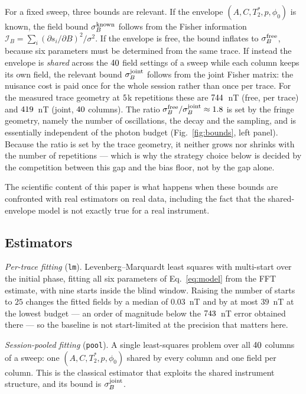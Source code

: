 \documentclass[aps,pra,twocolumn,superscriptaddress,nofootinbib]{revtex4-2}
\begin{document}
For a fixed sweep, three bounds are relevant. If the envelope $(A,C,T_2^{*},p,\phi_0)$ is
known, the field bound $\sigma_B^{\rm known}$ follows from the Fisher information
$\mathcal{I}_B=\sum_i(\partial s_i/\partial B)^2/\sigma^2$. If the envelope is free, the
bound inflates to $\sigma_B^{\rm free}$, because six parameters must be determined from the
same trace. If instead the envelope is \emph{shared} across the $40$ field settings of
a sweep while each column keeps its own field, the relevant bound
$\sigma_B^{\rm joint}$ follows from the joint Fisher matrix: the nuisance cost is paid once
for the whole session rather than once per trace. For the measured trace geometry at
$5$k repetitions these are $744$~nT (free, per trace) and
$419$~nT (joint, $40$ columns). The ratio
$\sigma_B^{\rm free}/\sigma_B^{\rm joint}\approx1.8$ is set by the fringe geometry, namely
the number of oscillations, the decay and the sampling, and is essentially independent of
the photon budget (Fig.~\ref{fig:bounds}, left panel). Because the ratio is set by the trace
geometry, it neither grows nor shrinks with the number of repetitions --- which is why the
strategy choice below is decided by the competition between this gap and the bias floor,
not by the gap alone.

The scientific content of this paper is what happens when these bounds are confronted with
real estimators on real data, including the fact that the shared-envelope model is not
exactly true for a real instrument.

\subsection{Estimators}

\emph{Per-trace fitting} (\texttt{lm}). Levenberg--Marquardt least squares with
multi-start over the initial phase, fitting all six parameters of Eq.~\eqref{eq:model} from
the FFT estimate, with nine starts inside the blind window. Raising the number of starts to
$25$ changes the fitted fields by a median of $0.03$~nT and by at most $39$~nT at the
lowest budget --- an order of magnitude below the $743$~nT error obtained
there --- so the baseline is not start-limited at the precision that matters here.

\emph{Session-pooled fitting} (\texttt{pool}). A single least-squares problem over all
$40$ columns of a sweep: one $(A,C,T_2^{*},p,\phi_0)$ shared by every column and one
field per column. This is the classical estimator that exploits the shared instrument
structure, and its bound is $\sigma_B^{\rm joint}$.
\end{document}
